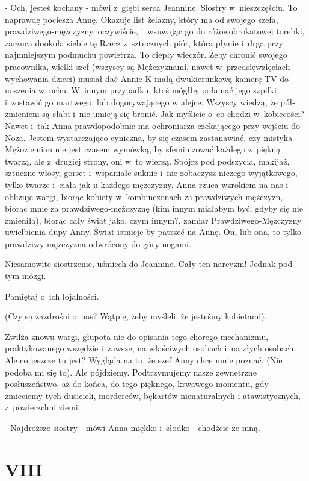 \documentclass[oneside,polish,12pt,sfheadings]{mwbk}
\begin{document}
- Och, jesteś kochany - mówi z~głębi serca Jeannine. Siostry w~nieszczęściu.
To naprawdę pociesza Annę. Okazuje list żelazny, który ma od swojego
szefa, prawdziwego-mężczyzny, oczywiście, i~wsuwając go do różowobrokatowej
torebki, zarzuca dookoła siebie tę Rzecz z~sztucznych piór, która
płynie i~drga przy najmniejszym podmuchu powietrza. To ciepły wieczór.
Żeby chronić swojego pracownika, wielki szef (wszyscy są Mężczyznami,
nawet w~przedsięwzięciach wychowania dzieci) musiał dać Annie K małą
dwukierunkową kamerę TV do noszenia w~uchu. W~innym przypadku, ktoś
mógłby połamać jego szpilki i~zostawić go martwego, lub dogorywającego
w alejce. Wszyscy wiedzą, że pół-zmienieni są słabi i~nie umieją się
bronić. Jak myślicie o~co chodzi w~kobiecości? Nawet i~tak Anna prawdopodobnie
ma ochroniarza czekającego przy wejściu do Noża. Jestem wystarczająco
cyniczna, by się czasem zastanawiać, czy mistyka Mężoziemian nie jest
czasem wymówką, by sfeminizować każdego z~piękną twarzą, ale z~drugiej
strony, oni w~to wierzą. Spójrz pod podszycia, makijaż, sztuczne włosy,
gorset i~wspaniałe suknie i~nie zobaczysz niczego wyjątkowego, tylko
twarze i~ciała jak u każdego mężczyzny. Anna rzuca wzrokiem na nas
i oblizuje wargi, biorąc kobiety w~kombinezonach za prawdziwych-mężczyzn,
biorąc mnie za prawdziwego-mężczyznę (kim innym miałabym być, gdyby
się nie zmieniła), biorąc cały świat jako, czym innym?, zamiar Prawdziwego-Mężczyzny
uwielbienia dupy Anny. Świat istnieje by patrzeć na Annę. On, lub
ona, to tylko prawdziwy-mężczyzna odwrócony do góry nogami.

Niesamowite siostrzenie, uśmiech do Jeannine. Cały ten narcyzm! Jednak
pod tym mózgi.

Pamiętaj o~ich lojalności.

(Czy są zazdrośni o~nas? Wątpię, żeby myśleli, że jesteśmy kobietami).

Zwilża znowu wargi, głupota nie do opisania tego chorego mechanizmu,
praktykowanego wszędzie i~zawsze, na właściwych osobach i~na złych
osobach. Ale co jeszcze tu jest? Wygląda na to, że szef Anny chce
mnie poznać. (Nie podoba mi się to). Ale pójdziemy. Podtrzymujemy
nasze zewnętrzne posłuszeństwo, aż do końca, do tego pięknego, krwawego
momentu, gdy zmieciemy tych dusicieli, morderców, bękartów nienaturalnych
i atawistycznych, z~powierzchni ziemi.

- Najdroższe siostry - mówi Anna miękko i~słodko - chodźcie ze mną.

\chapter{VIII}
\end{document}
